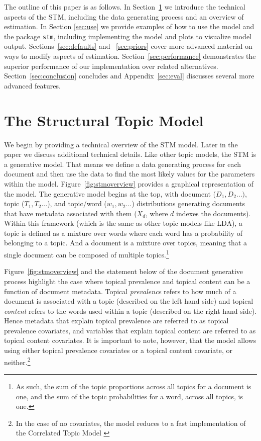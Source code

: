 \documentclass[article,shortnames]{jss}
\begin{document}
The outline of this paper is as follows. In Section~\ref{sec:est} we introduce the technical aspects of the STM, including the data generating process and an overview of estimation.  In Section \ref{sec:use} we provide examples of how to use the model and the package \texttt{stm}, including implementing the model and plots to visualize model output. Sections~\ref{sec:defaults} and ~\ref{sec:priors} cover more advanced material on ways to modify aspects of estimation. Section~\ref{sec:performance} demonstrates the superior performance of our implementation over related alternatives.  Section~\ref{sec:conclusion} concludes and Appendix~\ref{sec:eval} discusses several more advanced features.

\section{The Structural Topic Model}
\label{sec:est}

We begin by providing a technical overview of the STM model. Later in the paper we discuss additional technical details. Like other topic models, the STM is a generative model. That means we define a data generating process for each document and then use the data to find the most likely values for the parameters within the model.  Figure~\ref{fig:stmoverview} provides a graphical representation of the model. The generative model begins at the top, with document ($D_1,D_2...)$, topic ($T_1,T_2...$), and topic/word ($w_1,w_2$...) distributions generating documents that have metadata associated with them ($X_d$, where $d$ indexes the documents). Within this framework (which is the same as other topic models like LDA), a topic is defined as a mixture over words where each word has a probability of belonging to a topic. And a document is a mixture over topics, meaning that a single document can be composed of multiple topics.\footnote{As such, the sum of the topic proportions across all topics for a document is one, and the sum of the topic probabilities for a word, across all topics, is one.}

Figure~\ref{fig:stmoverview} and the statement below of the document generative process highlight the case where topical prevalence and topical content can be a function of document metadata. Topical \emph{prevalence} refers to how much of a document is associated with a topic (described on the left hand side) and topical \emph{content} refers to the words used within a topic (described on the right hand side). Hence metadata that explain topical prevalence are referred to as topical prevalence covariates, and variables that explain topical content are referred to as topical content covariates. It is important to note, however, that the model allows using either topical prevalence covariates or a topical content covariate, or neither.\footnote{In the case of no covariates, the model reduces to a fast implementation of the Correlated Topic Model \citep{blei2007correlated}}
\end{document}
